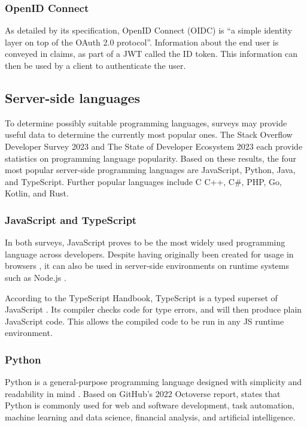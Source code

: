 \subsubsection{OpenID Connect}
As detailed by its specification, OpenID Connect (OIDC) is ``a simple identity layer on top of the OAuth 2.0 protocol''. Information about the end user is conveyed in claims, as part of a JWT called the ID token. This information can then be used by a client to authenticate the user. \autocite{Sakimura2014} 

\subsection{Server-side languages}
To determine possibly suitable programming languages, surveys may provide useful data to determine the currently most popular ones. The Stack Overflow Developer Survey 2023 \autocite{StackOverflow2023} and The State of Developer Ecosystem 2023 \autocite{JetBrains2023} each provide statistics on programming language popularity. Based on these results, the four most popular server-side programming languages are JavaScript, Python, Java, and TypeScript. Further popular languages include   C C++, C\#, PHP, Go, Kotlin, and Rust.

\subsubsection{JavaScript and TypeScript}
In both surveys, JavaScript proves to be the most widely used programming language across developers. Despite having originally been created for usage in browsers \autocite{NCC1995}, it can also be used in server-side environments on runtime systems such as Node.js \autocite{OpenJSFoundation}.

According to the TypeScript Handbook, TypeScript is a typed superset of JavaScript \autocite{TypeScript2023}. Its compiler checks code for type errors, and will then produce plain JavaScript code. This allows the compiled code to be run in any JS runtime environment.

\subsubsection{Python}
Python is a general-purpose programming language designed with simplicity and readability in mind \autocite{Peters2004}. Based on GitHub's 2022 Octoverse report, \textcite{Scarlett2023} states that Python is commonly used for web and software development, task automation, machine learning and data science, financial analysis, and artificial intelligence.

